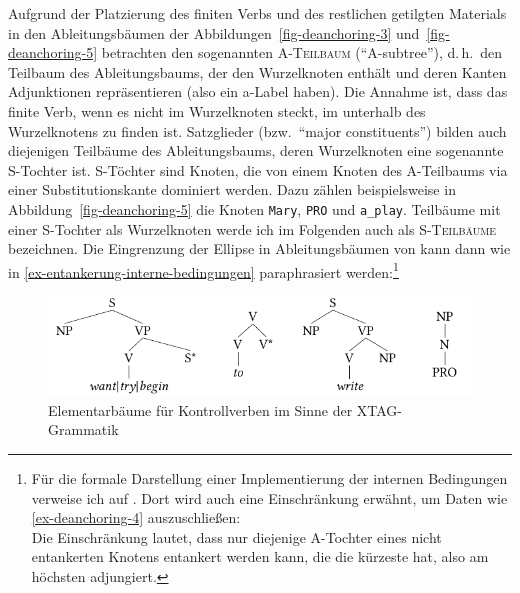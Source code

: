 Aufgrund der Platzierung des finiten Verbs und des restlichen getilgten Materials in den Ableitungsbäumen der Abbildungen~\ref{fig-deanchoring-3} und~\ref{fig-deanchoring-5} betrachten \cite{Lichte:Kallmeyer:10} den sogenannten \textsc{A-Teilbaum} ("`A-subtree"'), d.\,h.\ den Teilbaum des Ableitungsbaums, der den Wurzelknoten enthält und deren Kanten Adjunktionen repräsentieren (also ein {\sc a}-Label haben). Die Annahme ist, dass das finite Verb, wenn es nicht im Wurzelknoten steckt, im  unterhalb des Wurzelknotens zu finden ist. Satzglieder (bzw.\ "`major constituents"') bilden auch diejenigen Teilbäume des Ableitungsbaums, deren Wurzelknoten eine sogenannte S-Tochter ist. S-Töchter sind Knoten, die von einem Knoten des A-Teilbaums via einer Substitutionskante dominiert werden. Dazu zählen beispielsweise in Abbildung~\ref{fig-deanchoring-5} die Knoten {\tt Mary}, {\tt PRO} und {\tt a\_play}.  Teilbäume mit einer S-Tochter als Wurzelknoten werde ich im Folgenden auch als \textsc{S-Teilbäume} bezeichnen. Die Eingrenzung der Ellipse in Ableitungsbäumen von \cite{Lichte:Kallmeyer:10} kann dann wie in \ref{ex-entankerung-interne-bedingungen} paraphrasiert werden:\footnote{Für die formale Darstellung einer Implementierung der internen Bedingungen verweise ich auf \cite{Lichte:Kallmeyer:10}. Dort wird auch eine Einschränkung erwähnt, um Daten wie \ref{ex-deanchoring-4} auszuschlie\ss en:\\
Die Einschränkung lautet, dass nur diejenige A-Tochter eines nicht entankerten Knotens entankert werden kann, die die kürzeste  hat, also am höchsten adjungiert. 
} 
\begin{figure}[p]
\centering
\includegraphics{graphics/abb817.pdf}
\caption{\label{fig-deanchoring-4}Elementarbäume für Kontrollverben im Sinne der XTAG-Grammatik \citep[Abbildung~5]{Lichte:Kallmeyer:10}}
\end{figure}

